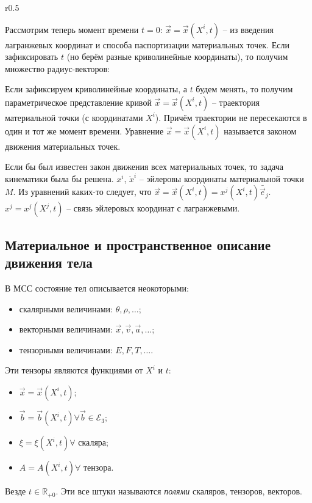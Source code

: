 \begin{wrapfigure}{r}{0.5\textwidth}
	\centering
	
\end{wrapfigure}

Рассмотрим теперь момент времени $t = 0$: $\vec{x} = \vec{x}(X^i, t)$ -- из введения лагранжевых 
координат и способа паспортизации материальных точек. Если зафиксировать $t$ (но берём разные
криволинейные координаты), то получим множество радиус-векторов:

%	

Если зафиксируем криволинейные координаты, а $t$ будем менять, то получим параметрическое
представление кривой $\vec{x} = \vec{x} ( X^i, t )$ -- траектория материальной точки (с координатами
$X^i$). Причём траектории не пересекаются в один и тот же момент времени. Уравнение $\vec{x} = \vec{x}(X^i, t)$ называется законом движения материальных точек.

Если бы был известен закон движения всех материальных точек, то задача кинематики была бы решена.
$x^{i}$, $\mathring{x}^i$ -- эйлеровы координаты материальной точки $M$. Из уравнений каких-то
следует, что $\vec{x} = \vec{x} (X^i, t) = x^j ( X^i, t) \bar{\vec{e}}_j$. $x^j = x^j(X^j, t)$
-- связь эйлеровых координат с лагранжевыми.

\subsection{Материальное и пространственное описание движения тела}

В МСС состояние тел описывается неокоторыми:
\begin{itemize}
  \item скалярными величинами: $\theta, \rho, \dots$;
  \item векторными величинами: $\vec{x}, \vec{v}, \vec{a}, \dots$;
  \item тензорными величинами: $E, F, T, \dots$.
\end{itemize}

Эти тензоры являются функциями от $X^i$ и $t$:
\begin{itemize}
  \item $\vec{x} = \vec{x} (X^i, t)$;
  \item $\vec{b} = \vec{b} (X^i, t) \forall \vec{b} \in \mathcal{E}_3$;
  \item $\xi = \xi(X^i, t) \forall $ скаляра;
  \item $A = A(X^i, t) \forall$ тензора.
\end{itemize}
Везде $t \in \mathbb{R}_{+0}$. Эти все штуки называются \emph{полями} скаляров, тензоров, векторов.

